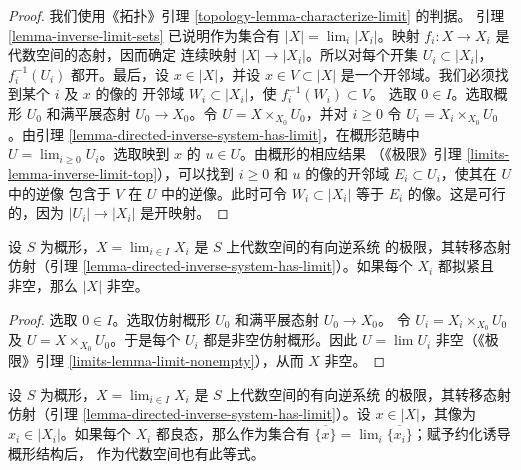 \begin{proof}
我们使用《拓扑》引理 \ref{topology-lemma-characterize-limit} 的判据。
引理 \ref{lemma-inverse-limit-sets} 已说明作为集合有
$|X|=\lim_i|X_i|$。映射 $f_i:X\to X_i$ 是代数空间的态射，因而确定
连续映射 $|X|\to|X_i|$。所以对每个开集 $U_i\subset|X_i|$，
$f_i^{-1}(U_i)$ 都开。最后，设 $x\in|X|$，并设
$x\in V\subset|X|$ 是一个开邻域。我们必须找到某个 $i$ 及 $x$ 的像的
开邻域 $W_i\subset|X_i|$，使 $f_i^{-1}(W_i)\subset V$。
选取 $0\in I$。选取概形 $U_0$ 和满平展态射 $U_0\to X_0$。令
$U=X\times_{X_0}U_0$，并对 $i\geq0$ 令
$U_i=X_i\times_{X_0}U_0$。由引理
\ref{lemma-directed-inverse-system-has-limit}，在概形范畴中
$U=\lim_{i\geq0}U_i$。选取映到 $x$ 的 $u\in U$。由概形的相应结果
（《极限》引理 \ref{limits-lemma-inverse-limit-top}），可以找到
$i\geq0$ 和 $u$ 的像的开邻域 $E_i\subset U_i$，使其在 $U$ 中的逆像
包含于 $V$ 在 $U$ 中的逆像。此时可令 $W_i\subset|X_i|$ 等于
$E_i$ 的像。这是可行的，因为 $|U_i|\to|X_i|$ 是开映射。
\end{proof}

\begin{lemma}
\label{lemma-limit-nonempty}
设 $S$ 为概形，$X=\lim_{i\in I}X_i$ 是 $S$ 上代数空间的有向逆系统
的极限，其转移态射仿射（引理
\ref{lemma-directed-inverse-system-has-limit}）。如果每个 $X_i$ 都拟紧且
非空，那么 $|X|$ 非空。
\end{lemma}

\begin{proof}
选取 $0\in I$。选取仿射概形 $U_0$ 和满平展态射 $U_0\to X_0$。
令 $U_i=X_i\times_{X_0}U_0$ 及 $U=X\times_{X_0}U_0$。于是每个
$U_i$ 都是非空仿射概形。因此 $U=\lim U_i$ 非空（《极限》引理
\ref{limits-lemma-limit-nonempty}），从而 $X$ 非空。
\end{proof}

\begin{lemma}
\label{lemma-inverse-limit-irreducibles}
设 $S$ 为概形，$X=\lim_{i\in I}X_i$ 是 $S$ 上代数空间的有向逆系统
的极限，其转移态射仿射（引理
\ref{lemma-directed-inverse-system-has-limit}）。设 $x\in|X|$，其像为
$x_i\in|X_i|$。如果每个 $X_i$ 都良态，那么作为集合有
$\overline{\{x\}}=\lim_i\overline{\{x_i\}}$；赋予约化诱导概形结构后，
作为代数空间也有此等式。%
\end{lemma}

